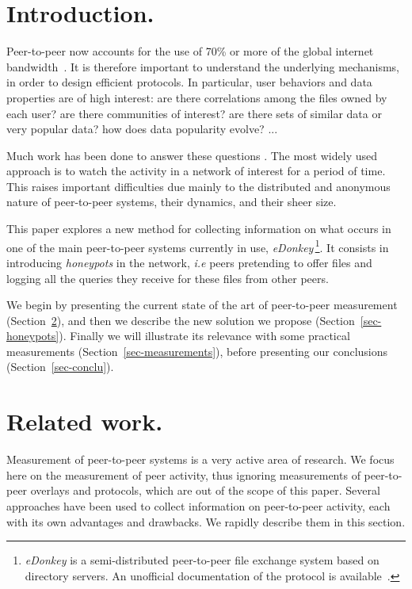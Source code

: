 \documentclass[final,
notitlepage,
narroweqnarray,
	inline,
	twoside,
]{ieee}
\newcommand{\noteperso}[1]{\begin{center}
 \fbox{\begin{minipage}{6cm}#1\end{minipage}}\end{center}}
\renewcommand{\noteperso}[1]{}
\begin{document}
\noteperso{ML: pour toutes les courbes ou on observe qqe chose de lineaire voir la pente de la droite dans le .tex original}

\section{Introduction.}

Peer-to-peer now accounts for the use of 70\% or more of the global
internet bandwidth~\cite{cisco,adsl}. It is therefore important to
understand the underlying mechanisms, in order to design efficient
protocols. In particular, user behaviors and data properties are of
high interest: are there correlations among the files owned by each
user? are there communities of interest? are there sets of similar
data or very popular data? how does data popularity evolve? ...

Much work has been done to answer these questions \cite{kasa,pam,isp}. The most widely used approach is to watch the activity in a network of interest for a period of time. This raises important difficulties due mainly to the distributed and anonymous nature of peer-to-peer systems, their dynamics, and their sheer size.

This paper explores a new method for collecting information on what
occurs in one of the main peer-to-peer systems currently in use, {\em
  eDonkey}\,\footnote{{\em eDonkey} is a semi-distributed peer-to-peer file
  exchange system based on directory servers. An unofficial
  documentation of the protocol is available~\cite{edonkey}.}.
It consists in introducing {\em honeypots} in the network,
 {\em i.e} peers pretending to offer files and logging
all the queries they receive for these files from other peers.

We begin by presenting the current state of the art of peer-to-peer measurement (Section~\ref{sec-related}), and then we describe
the new solution we propose (Section~\ref{sec-honeypots}). Finally we will illustrate its relevance
with some practical measurements (Section~\ref{sec-measurements}),
before presenting our conclusions (Section~\ref{sec-conclu}).


\section{Related work.}
\label{sec-related}
Measurement of peer-to-peer systems is a very active area of research. We focus here on the measurement of peer activity, thus ignoring measurements of peer-to-peer overlays and protocols, which are out of the scope of this paper.
Several approaches have been used to collect information on peer-to-peer activity, each with its own advantages and drawbacks. We rapidly describe them in this section.
\end{document}
